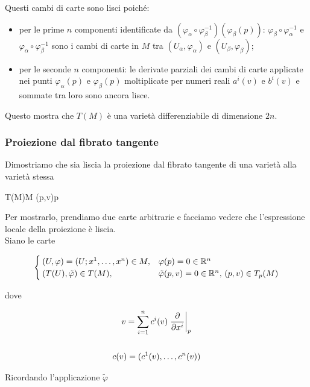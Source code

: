 Questi cambi di carte sono lisci poiché:

\begin{itemize}
	\item per le prime $ n $ componenti identificate da $ (\varphi_{\alpha} \circ \varphi_{\beta}^{-1})(\varphi_{\beta}(p)) $: $ \varphi_{\beta} \circ \varphi_{\alpha}^{-1} $ e $ \varphi_{\alpha} \circ \varphi_{\beta}^{-1} $ sono i cambi di carte in $ M $ tra $ (U_{\alpha},\varphi_{\alpha}) $ e $ (U_{\beta},\varphi_{\beta}) $;
	
	\item per le seconde $ n $ componenti: le derivate parziali dei cambi di carte applicate nei punti $ \varphi_{\alpha}(p) $ e $ \varphi_{\beta}(p) $ moltiplicate per numeri reali $ a^{i}(v) $ e $ b^{i}(v) $ e sommate tra loro sono ancora lisce.
\end{itemize}

Questo mostra che $ T(M) $ è una varietà differenziabile di dimensione $ 2n $.

\subsubsection{Proiezione dal fibrato tangente}

Dimostriamo che sia liscia la proiezione dal fibrato tangente di una varietà alla varietà stessa

\map{\pi}
	{T(M)}{M}
	{(p,v)}{p}

Per mostrarlo, prendiamo due carte arbitrarie e facciamo vedere che l'espressione locale della proiezione è liscia. \\
Siano le carte

\begin{equation}
	\begin{cases}
		(U,\varphi) = (U; x^{1},\dots,x^{n}) \in M, & \varphi(p) = 0 \in \mathbb{R}^{n} \\
		(T(U),\tilde{\varphi}) \in T(M), & \tilde{\varphi}(p,v) = 0 \in \mathbb{R}^{n}, \, (p,v) \in T_{p}(M)
	\end{cases}
\end{equation}

dove

\begin{gather}
	v = \displaystyle \sum_{i=1}^{n} c^{i}(v) \eval{ \pdv{x^{i}} }_{p} \\
	\nonumber \\
	c(v) = (c^{1}(v),\dots,c^{n}(v))
\end{gather}

Ricordando l'applicazione $ \tilde{\varphi} $

